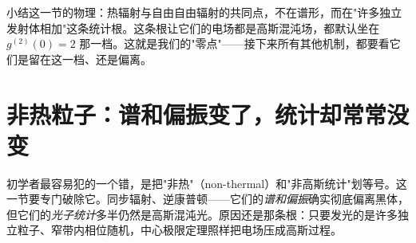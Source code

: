 小结这一节的物理：热辐射与自由自由辐射的共同点，不在谱形，而在"许多独立发射体相加"这条统计根。这条根让它们的电场都是高斯混沌场，都默认坐在 \(g^{(2)}(0)=2\) 那一档。这就是我们的"零点"——接下来所有其他机制，都要看它们是留在这一档、还是偏离。

\section{非热粒子：谱和偏振变了，统计却常常没变}
\label{sec:e16-nonthermal}

初学者最容易犯的一个错，是把"非热"（non-thermal）和"非高斯统计"划等号。这一节要专门破除它。同步辐射、逆康普顿——它们的\emph{谱和偏振}确实彻底偏离黑体，但它们的\emph{光子统计}多半仍然是高斯混沌光。原因还是那条根：只要发光的是许多独立粒子、窄带内相位随机，中心极限定理照样把电场压成高斯过程。

